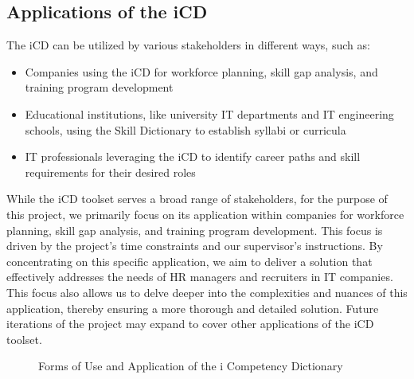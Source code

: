 \subsection{Applications of the iCD}
The iCD can be utilized by various stakeholders in different ways, such as:

\begin{itemize}
    \item Companies using the iCD for workforce planning, skill gap analysis, and training program development
    \item Educational institutions, like university IT departments and IT engineering schools, using the Skill Dictionary to establish syllabi or curricula
    \item IT professionals leveraging the iCD to identify career paths and skill requirements for their desired roles
\end{itemize}

While the iCD toolset serves a broad range of stakeholders, for the purpose of this project, we primarily focus on its application within companies for workforce planning, skill gap analysis, and training program development. This focus is driven by the project's time constraints and our supervisor's instructions. By concentrating on this specific application, we aim to deliver a solution that effectively addresses the needs of HR managers and recruiters in IT companies. This focus also allows us to delve deeper into the complexities and nuances of this application, thereby ensuring a more thorough and detailed solution. Future iterations of the project may expand to cover other applications of the iCD toolset.

\begin{figure}[H]
    \centering
    \caption{Forms of Use and Application of the i Competency Dictionary}
    \label{fig:iCD_Forms_Of_Use}
\end{figure}

